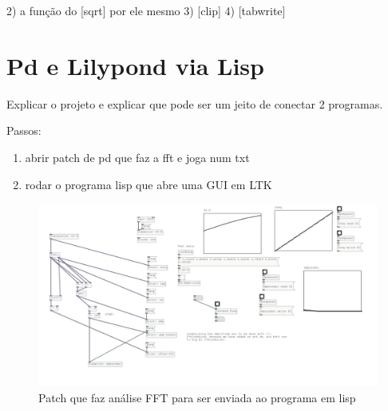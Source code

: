 \documentclass{ppgmus}
\begin{document}
2) a função do [sqrt\texttildelow] por ele mesmo
3) [clip\texttildelow]
4) [tabwrite\texttildelow]

\section{Pd e Lilypond via Lisp}

Explicar o projeto e explicar que pode ser um jeito de conectar 2 programas.

Passos:

\begin{enumerate}
\item abrir patch de pd que faz a fft e joga num txt

\item rodar o programa lisp que abre uma GUI em LTK
\end{enumerate}



\begin{figure}
\includegraphics[scale=.6]{pd-lisp1}
\caption{Patch que faz análise FFT para ser enviada ao programa em lisp}
\label{pd-lisp1}
\end{figure} 



\end{document}
